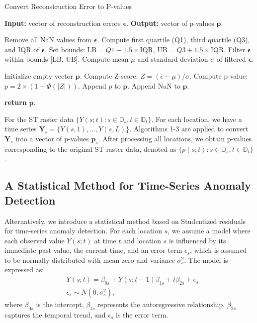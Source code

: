\documentclass[11pt]{article}
\begin{document}
\begin{algorithm}
\caption{Convert Reconstruction Error to P-values}\label{alg: convert errors to p-values}
\begin{algorithmic}[1]
\State \textbf{Input:} vector of reconstruction errors $\bm{\epsilon}$.
\State \textbf{Output:} vector of p-values $\bm{p}$.

\State Remove all NaN values from $\bm{\epsilon}$.
\State Compute first quartile (Q1), third quartile (Q3), and IQR of $\bm{\epsilon}$.
\State Set bounds: $\text{LB} = Q1 - 1.5 \times \text{IQR}$, $\text{UB} = Q3 + 1.5 \times \text{IQR}$.
\State Filter $\bm{\epsilon}$ within bounds [$\text{LB}$, $\text{UB}$].
\State Compute mean $\mu$ and standard deviation $\sigma$ of filtered $\bm{\epsilon}$.

\State Initialize empty vector $\bm{p}$.
\For{$\epsilon \in \bm{\epsilon}$}
        \State Compute Z-score: $Z = (\epsilon - \mu)/\sigma$.
        \State Compute p-value: $p = 2 \times (1 - \Phi(|Z|))$.
        \State Append $p$ to $\bm{p}$.
    \Else
        \State Append NaN to $\bm{p}$.
    \EndIf
\EndFor

\State \textbf{return} $\bm{p}$.
\end{algorithmic}
\end{algorithm}


For the ST raster data $\{Y(s;t):s\in \mathbb{D}_s, t\in \mathbb{D}_t\}$. For each location, we have a time series $\bm{Y}_s=\{Y(s,1),\ldots, Y(s,L)\}$. Algorithms 1-3 are applied to convert $\bm{Y}_s$ into a vector of p-values $\bm{p}_s$. After processing all locations, we obtain p-values corresponding to the original ST raster data, denoted as $\{p(s;t):s\in \mathbb{D}_s, t\in \mathbb{D}_t\}$.




\subsection{A Statistical Method for Time-Series Anomaly Detection}\label{sec:Outlier Detection for Individual Location}
Alternatively, we introduce a statistical method based on Studentized residuals for time-series anomaly detection. For each location $s$, we assume a model where each observed value $Y(s;t)$ at time $t$ and location $s$ is influenced by its immediate past value, the current time, and an error term $\epsilon_s$, which is assumed to be normally distributed with mean zero and variance $\sigma_s^2$. The model is expressed as:
\begin{align}
	&Y(s;t) = \beta_{0s} + Y(s;t-1)\beta_{1s} + t\beta_{2s}+\epsilon_s \\
	&\epsilon_s \sim N(0,\sigma_s^2) \nonumber,
\end{align}
	where $\beta_{0s}$ is the intercept, $\beta_{1s}$ represents the autoregressive relationship, $\beta_{2s}$ captures the temporal trend, and $\epsilon_s$ is the error term.
	
\end{document}

